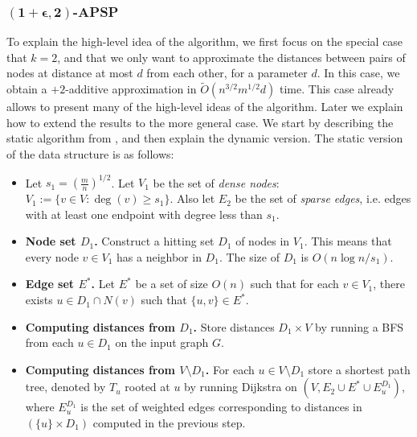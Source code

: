 \documentclass[11pt]{article}
\theoremstyle{definition}
\theoremstyle{remark}
\begin{document}
\subsubsection{\texorpdfstring{$\mathbf{(1+\epsilon,2)}$}{(1+epsilon)}-APSP}
To explain the high-level idea of the algorithm, we first focus on the special case that $k=2$, and that we only want to approximate the distances between pairs of nodes at distance at most $d$ from each other, for a parameter $d$. In this case, we obtain a $+2$-additive approximation in $\tilde{O}(n^{3/2}m^{1/2} d )$ time. This case already allows to present many of the high-level ideas of the algorithm. Later we explain how to extend the results to the more general case.
 We start by describing the static algorithm from \cite{DHZ00}, and then explain the dynamic version. 
The static version of the data structure is as follows:

\begin{itemize}
    \setlength\itemsep{0em}
    \item Let $s_1= (\frac{m}{n})^{1/2}$. Let $V_1$ be the set of \textit{dense nodes}: $V_1:= \{ v \in V: \deg(v) \geq s_1\}$. Also let $E_2$ be the set of \textit{sparse edges}, i.e. edges with at least one endpoint with degree less than $s_1$.
    \item \textbf{Node set $D_1$.} Construct a hitting set $D_1$ of nodes in $V_1$. %
    This means that every node $v \in V_1$ has a neighbor in $D_1$. The size of $D_1$ is $O(n \log{n}/s_1)$.
    \item \textbf{Edge set $E^*$.} Let $E^*$ be a set of size $O(n)$ such that for each $v \in V_1$, there exists $u \in D_1 \cap N(v)$ such that $\{u,v\} \in E^*$.
    \item \textbf{Computing distances from $D_1$.} Store distances $D_1 \times V$ by running a BFS from each $u \in D_1$ on the input graph $G$. 
    \item \textbf{Computing distances from $V \setminus D_1$. } For each $u \in V \setminus D_1$ store a shortest path tree, denoted by $T_u$  rooted at $u$ by running Dijkstra on $(V, E_2 \cup E^* \cup E^{D_1}_u)$, where $E^{D_1}_u$ is the set of weighted edges corresponding to distances in $(\{u\} \times D_1)$ computed in the previous step. 
\end{itemize}
\end{document}
